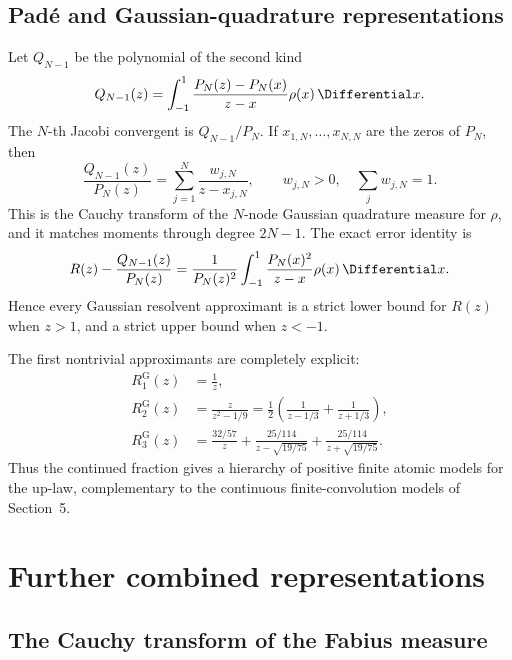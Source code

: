 \documentclass[11pt]{article}
\theoremstyle{definition}
\theoremstyle{remark}
\begin{document}
\subsection{Pad\'e and Gaussian-quadrature representations}

Let \(Q_{N-1}\) be the polynomial of the second kind
\begin{equation}
 Q_{N-1}(z)=\int_{-1}^{1}
 \frac{P_N(z)-P_N(x)}{z-x}\rho(x)\,\Differential x.                    \label{p1:eq:second-kind}
\end{equation}
The \(N\)-th Jacobi convergent is \(Q_{N-1}/P_N\).  If
\(x_{1,N},\dots,x_{N,N}\) are the zeros of \(P_N\), then
\begin{equation}
 \boxed{
 \frac{Q_{N-1}(z)}{P_N(z)}
 =\sum_{j=1}^{N}\frac{w_{j,N}}{z-x_{j,N}},
 \qquad w_{j,N}>0,\quad \sum_jw_{j,N}=1.
 }                                                           \label{p1:eq:gauss-partial}
\end{equation}
This is the Cauchy transform of the \(N\)-node Gaussian quadrature measure for \(\rho\),
and it matches moments through degree \(2N-1\).  The exact error identity is
\begin{equation}
 R(z)-\frac{Q_{N-1}(z)}{P_N(z)}
 =\frac1{P_N(z)^2}\int_{-1}^{1}
 \frac{P_N(x)^2}{z-x}\rho(x)\,\Differential x.                        \label{p1:eq:Markov-error}
\end{equation}
Hence every Gaussian resolvent approximant is a strict lower bound for \(R(z)\) when
\(z>1\), and a strict upper bound when \(z<-1\).

The first nontrivial approximants are completely explicit:
\begin{align}
 R_1^{\mathrm G}(z)&=\frac1z,\\
 R_2^{\mathrm G}(z)&=\frac{z}{z^2-1/9}
 =\frac12\left(\frac1{z-1/3}+\frac1{z+1/3}\right),\\
 R_3^{\mathrm G}(z)&=
 \frac{32/57}{z}
 +\frac{25/114}{z-\sqrt{19/75}}
 +\frac{25/114}{z+\sqrt{19/75}}.
\end{align}
Thus the continued fraction gives a hierarchy of positive finite atomic models for the
up-law, complementary to the continuous finite-convolution models of Section~5.

\section{Further combined representations}

\subsection{The Cauchy transform of the Fabius measure}
\end{document}
